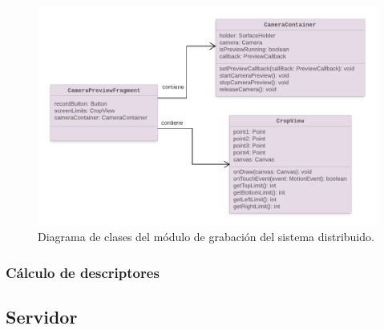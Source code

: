 	\begin{figure}[!h]
		\centering
		\includegraphics[scale=1.6]{imagenes/cap4/diagrama_modulo_captura.png}
		\caption{Diagrama de clases del módulo de grabación del sistema distribuido.}
		\label{diagrama_modulo_captura}
	\end{figure}


\subsubsection*{Cálculo de descriptores}







\subsection{Servidor}
